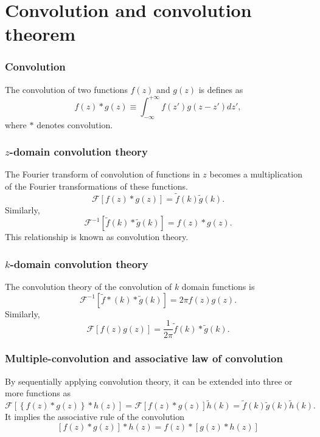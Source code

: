 \documentclass{article}[10pt,a4paper]
\newcommand{\ft}[1]{\mathcal{F}\left[{#1}\right]\xspace}
\newcommand{\ift}[1]{\mathcal{F}^{-1}\left[{#1}\right]\xspace}
\newcommand{\intinfty}{\int^{+\infty}_{-\infty}\xspace}
\begin{document}
\section{Convolution and convolution theorem}
\subsubsection*{Convolution}
The convolution of two functions $f(z)$ and $g(z)$ is defines as
\begin{equation}
 f(z)*g(z) \equiv \intinfty f(z') g(z-z') dz',
\end{equation}
where $*$ denotes convolution.

\subsubsection*{$z$-domain convolution theory}
The Fourier transform of convolution of functions in $z$ becomes a
multiplication of the Fourier transformations of these functions.
\begin{equation}
 \ft{f(z)*g(z)} = \tilde{f}(k) \tilde{g}(k).
\end{equation}
Similarly,
\begin{equation}
 \ift{\tilde{f}(k)*\tilde{g}(k)} = f(z)*g(z).
\end{equation}
This relationship is known as convolution theory.

\subsubsection*{$k$-domain convolution theory}
The convolution theory of the convolution of $k$ domain functions is
\begin{equation}
 \ift{\tilde{f}*(k)*\tilde{g}(k)} = 2\pi f(z)g(z).
\end{equation}
Similarly,
\begin{equation}
 \ft{f(z)g(z)} = \frac{1}{2\pi} \tilde{f}(k) *\tilde{g}(k).
\end{equation}

\subsubsection*{Multiple-convolution and associative law of convolution}
By sequentially applying convolution theory, it can be extended into
three or more functions as
\begin{equation}
 \ft{\left\{f(z)*g(z)\right\}*h(z)} 
  = \ft{f(z)*g(z)} \tilde{h}(k) 
  = \tilde{f}(k) \tilde{g}(k) \tilde{h}(k).
\end{equation}
It implies the associative rule of the convolution
\begin{equation}
 \left[f(z)*g(z)\right]*h(z) = f(z)*\left[g(z)*h(z)\right]
\end{equation}
\end{document}
